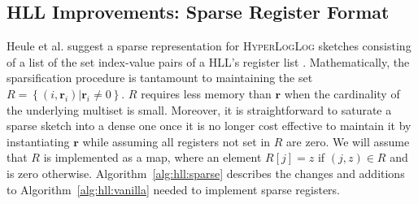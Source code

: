 \documentclass{report}
\newcommand{\algoname}[1]{\textnormal{\textsc{#1}}}
\begin{document}
\subsection{\algoname{HLL} Improvements: Sparse Register Format}
 \label{DS:sec:HLL:sparse}


Heule et al. suggest a sparse representation for \algoname{HyperLogLog} sketches consisting of a list of the set index-value pairs of a \algoname{HLL}'s register list \cite{heule2013hyperloglog}.
Mathematically, the sparsification procedure is tantamount to maintaining the set $R = \left \{(i, \mathbf{r}_i) | \mathbf{r}_i \neq 0 \right \}$.
$R$ requires less memory than $\mathbf{r}$ when the cardinality of the underlying multiset is small. 
Moreover, it is straightforward to saturate a sparse sketch into a dense one once it is no longer cost effective to maintain it by instantiating $\mathbf{r}$ while assuming all registers not set in $R$ are zero. 
We will assume that $R$ is implemented as a map, where an element $R[j] = z$ if $(j, z) \in R$ and is zero otherwise.
Algorithm~\ref{alg:hll:sparse} describes the changes and additions to Algorithm~\ref{alg:hll:vanilla} needed to implement sparse registers.
\end{document}
